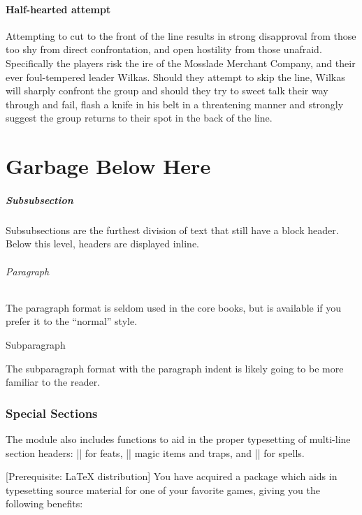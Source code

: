 \documentclass[letterpaper,twocolumn,openany,nodeprecatedcode]{dndbook}
\begin{document}
\subsection{Half-hearted attempt}
Attempting to cut to the front of the line results in strong disapproval from those too shy from direct confrontation, and open hostility from those unafraid. Specifically the players risk the ire of the Mosslade Merchant Company, and their ever foul-tempered leader Wilkas. Should they attempt to skip the line, Wilkas will sharply confront the group and should they try to sweet talk their way through and fail, flash a knife in his belt in a threatening manner and strongly suggest the group returns to their spot in the back of the line. 




\part{Garbage Below Here}
\subsubsection{Subsubsection}
Subsubsections are the furthest division of text that still have a block header. Below this level, headers are displayed inline.

\paragraph{Paragraph}
The paragraph format is seldom used in the core books, but is available if you prefer it to the ``normal'' style.

\subparagraph{Subparagraph}
The subparagraph format with the paragraph indent is likely going to be more familiar to the reader.

\section{Special Sections}
The module also includes functions to aid in the proper typesetting of multi-line section headers: |\DndFeatHeader| for feats, |\DndItemHeader| magic items and traps, and |\DndSpellHeader| for spells.

[Prerequisite: \LaTeX{} distribution]
You have acquired a package which aids in typesetting source material for one of your favorite games, giving you the following benefits:
\end{document}
